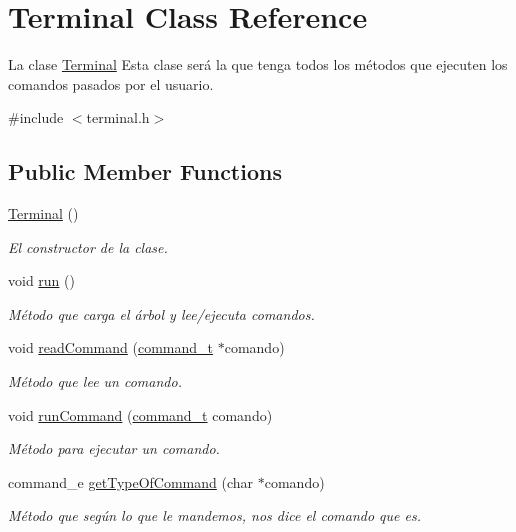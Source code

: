 \hypertarget{classTerminal}{}\section{Terminal Class Reference}
\label{classTerminal}


La clase \hyperlink{classTerminal}{Terminal} Esta clase será la que tenga todos los métodos que ejecuten los comandos pasados por el usuario.  




{\ttfamily \#include $<$terminal.\+h$>$}

\subsection*{Public Member Functions}
\begin{DoxyCompactItemize}
\item 
\hyperlink{classTerminal_aa448509b5aa1ece53c3d86385655be0e}{Terminal} ()
\begin{DoxyCompactList}\small\item\em El constructor de la clase. \end{DoxyCompactList}\item 
void \hyperlink{classTerminal_ac822276bd11e19db71d1b1410333c3c7}{run} ()
\begin{DoxyCompactList}\small\item\em Método que carga el árbol y lee/ejecuta comandos. \end{DoxyCompactList}\item 
void \hyperlink{classTerminal_aad3c1f2a554ab12d7f27a1fabded2b00}{read\+Command} (\hyperlink{structcommand__t}{command\+\_\+t} $\ast$comando)
\begin{DoxyCompactList}\small\item\em Método que lee un comando. \end{DoxyCompactList}\item 
void \hyperlink{classTerminal_a01d8fd8ffa9866b5355e65dc2582dc6a}{run\+Command} (\hyperlink{structcommand__t}{command\+\_\+t} comando)
\begin{DoxyCompactList}\small\item\em Método para ejecutar un comando. \end{DoxyCompactList}\item 
command\+\_\+e \hyperlink{classTerminal_a32bc1feca07a366d65f755e74c270766}{get\+Type\+Of\+Command} (char $\ast$comando)
\begin{DoxyCompactList}\small\item\em Método que según lo que le mandemos, nos dice el comando que es. \end{DoxyCompactList}\item 

\end{DoxyCompactItemize}

